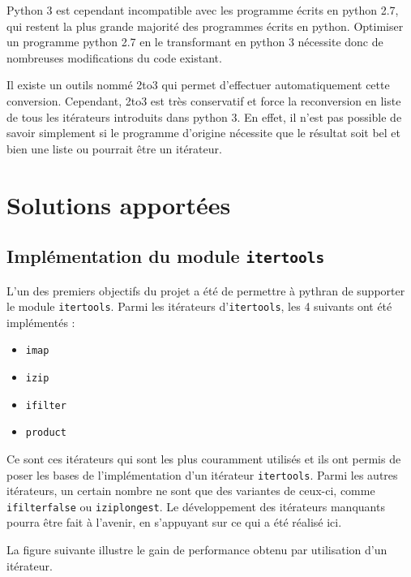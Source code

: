 \documentclass[a4paper]{article}
\begin{document}
Python 3 est cependant incompatible avec les programme écrits en
python 2.7, qui restent la plus grande majorité des programmes écrits
en python. Optimiser un programme python 2.7 en le transformant en
python 3 nécessite donc de nombreuses modifications du code existant.

Il existe un outils nommé 2to3 qui permet d'effectuer automatiquement
cette conversion. Cependant, 2to3 est très conservatif et force la
reconversion en liste de tous les itérateurs introduits dans python
3. En effet, il n'est pas possible de savoir simplement si le
programme d'origine nécessite que le résultat soit bel et bien une
liste ou pourrait être un itérateur.


\section*{Solutions apportées}

\subsection*{Implémentation du module \texttt{itertools}}

L'un des premiers objectifs du projet a été de permettre à pythran de
supporter le module \texttt{itertools}. Parmi les itérateurs d'\texttt{itertools}, les
4 suivants ont été implémentés :

\begin{itemize}
  \item \texttt{imap}
  \item \texttt{izip}
  \item \texttt{ifilter}
  \item \texttt{product}
\end{itemize}

Ce sont ces itérateurs qui sont les plus couramment utilisés et ils
ont permis de poser les bases de l'implémentation d'un itérateur
\texttt{itertools}. Parmi les autres itérateurs, un certain nombre ne
sont que des variantes de ceux-ci, comme \texttt{ifilterfalse} ou
\texttt{iziplongest}. Le développement des itérateurs manquants pourra
être fait à l'avenir, en s'appuyant sur ce qui a été réalisé ici.

La figure suivante illustre le gain de performance obtenu par
utilisation d'un itérateur.
\end{document}
